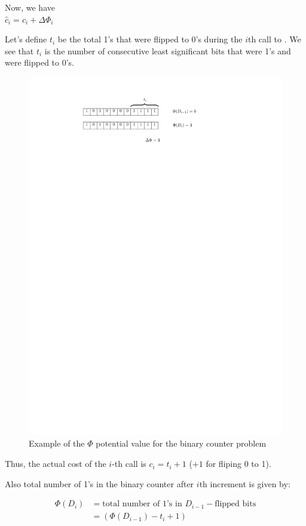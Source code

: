 \documentclass[11pt]{article}
\theoremstyle{definition}
\begin{document}
Now, we have \\
$\hat{c}_i = c_i + \Delta \Phi_i$

Let's define $t_i$ be the total 1's that were flipped to 0's during the $i$th call to .
We see that $t_i$ is the number of consecutive least significant bits that were 1's and were flipped to 0's. 
\begin{figure}[tbh]
\centering
\includegraphics[scale=1]{potential.pdf}
\caption{Example of the $\Phi$ potential value for the binary counter problem}
\label{fig:potential}
\end{figure}

Thus, the actual cost of the $i$-th call is $c_i = t_i+1$ ($+1$ for fliping 0 to 1).

Also total number of 1's in the binary counter after $i$th increment is given by:

\begin{align*}
\Phi(D_i) &= \text{total number of 1's in $D_{i-1} - $flipped bits} \\
          &= (\Phi(D_{i-1}) - t_i + 1)
\end{align*}
\end{document}
